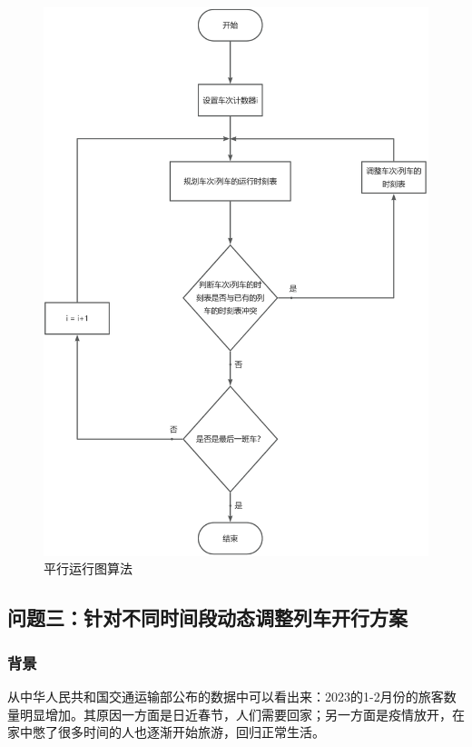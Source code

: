 \begin{figure}[h]
    \centering
    \includegraphics[scale=0.2]{res/figure170309.png}
    \caption{平行运行图算法}
    \label{figure170309}
\end{figure}

\subsection{问题三：针对不同时间段动态调整列车开行方案}

\subsubsection{背景}

从中华人民共和国交通运输部公布的数据中可以看出来：2023的1-2月份的旅客数量明显增加\cite{ChengShiKeYunTongJiShuJuZhongHuaRenMinGongHeGuoJiaoTongYunShuBu}。其原因一方面是日近春节，人们需要回家；另一方面是疫情放开，在家中憋了很多时间的人也逐渐开始旅游，回归正常生活。

